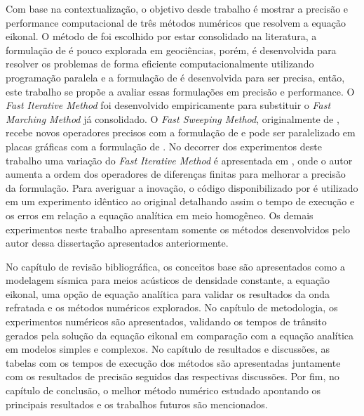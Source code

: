 Com base na contextualização, o objetivo desde trabalho é mostrar a precisão e performance computacional de três métodos numéricos que resolvem a equação eikonal. O método de  foi escolhido por estar consolidado na literatura, a formulação de  é pouco explorada em geociências, porém, é desenvolvida para resolver os problemas de forma eficiente computacionalmente utilizando programação paralela e a formulação de  é desenvolvida para ser precisa, então, este trabalho se propõe a avaliar essas formulações em precisão e performance. O \textit{Fast Iterative Method} \cite{jeong2008fast} foi desenvolvido empiricamente para substituir o \textit{Fast Marching Method} \cite{sethian19993} já consolidado. O \textit{Fast Sweeping Method}, originalmente de , recebe novos operadores precisos com a formulação de  e pode ser paralelizado em placas gráficas com a formulação de . No decorrer dos experimentos deste trabalho uma variação do \textit{Fast Iterative Method} é apresentada em , onde o autor aumenta a ordem dos operadores de diferenças finitas para melhorar a precisão da formulação. Para averiguar a inovação, o código disponibilizado por  é utilizado em um experimento idêntico ao original detalhando assim o tempo de execução e os erros em relação a equação analítica em meio homogêneo. Os demais experimentos neste trabalho apresentam somente os métodos desenvolvidos pelo autor dessa dissertação apresentados anteriormente.  
 
No capítulo de revisão bibliográfica, os conceitos base são apresentados como a modelagem sísmica para meios acústicos de densidade constante, a equação eikonal, uma opção de equação analítica para validar os resultados da onda refratada e os métodos numéricos explorados. No capítulo de metodologia, os experimentos numéricos são apresentados, validando os tempos de trânsito gerados pela solução da equação eikonal em comparação com a equação analítica em modelos simples e complexos. No capítulo de resultados e discussões, as tabelas com os tempos de execução dos métodos são apresentadas juntamente com os resultados de precisão seguidos das respectivas discussões. Por fim, no capítulo de conclusão, o melhor método numérico estudado apontando os principais resultados e os trabalhos futuros são mencionados.

